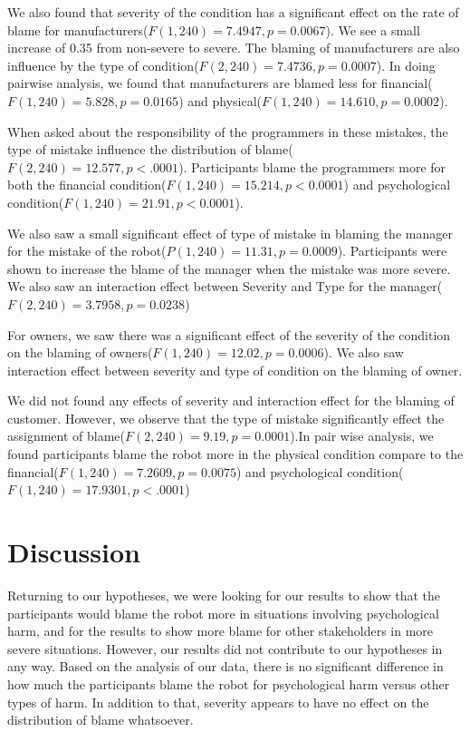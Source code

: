 \documentclass{sigchi}
\begin{document}
We also found that severity of the condition has a significant effect on the rate of blame for manufacturers($F(1,240)=7.4947, p = 0.0067$). We see a small increase of 0.35 from non-severe to severe. The blaming of manufacturers are also influence by the type of condition($F(2,240)=7.4736, p=0.0007$). In doing pairwise analysis, we found that manufacturers are blamed less for financial($F(1,240)=5.828, p = 0.0165$) and physical($F(1,240)=14.610, p = 0.0002$).

When asked about the responsibility of the programmers in these mistakes, the type of mistake influence the distribution of blame($F(2,240)=12.577, p < .0001$). Participants blame the programmers more for both the financial condition($F(1,240)=15.214, p < 0.0001$) and psychological condition($F(1,240)=21.91, p < 0.0001$).

We also saw a small significant effect of type of mistake in blaming the manager for the mistake of the robot($P(1,240)=11.31, p = 0.0009$). Participants were shown to increase the blame of the manager when the mistake was more severe. We also saw an interaction effect between Severity and Type for the manager($F(2,240)=3.7958, p = 0.0238$)

For owners, we saw there was a significant effect of the severity of the condition on the blaming of owners($F(1,240)=12.02, p=0.0006$). We also saw interaction effect between severity and type of condition on the blaming of owner.

We did not found any effects of severity and interaction effect for the blaming of customer. However, we observe that the type of mistake significantly effect the assignment of blame($F(2,240)=9.19, p=0.0001$).In pair wise analysis, we found participants blame the robot more in the physical condition compare to the financial($F(1,240)=7.2609, p = 0.0075$) and psychological condition($F(1,240)=17.9301, p < .0001$)

\section{Discussion}
Returning to our hypotheses, we were looking for our results to show that the participants would blame the robot more in situations involving psychological harm, and for the results to show more blame for other stakeholders in more severe situations. However, our results did not contribute to our hypotheses in any way. Based on the analysis of our data, there is no significant difference in how much the participants blame the robot for psychological harm versus other types of harm. In addition to that, severity appears to have no effect on the distribution of blame whatsoever.
\end{document}
